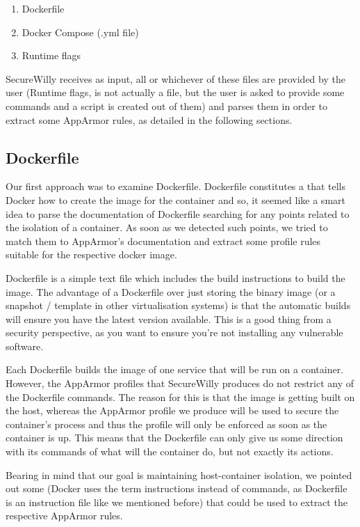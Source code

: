 \begin{enumerate}
\item Dockerfile
\item Docker Compose (.yml file)
\item Runtime flags
\end{enumerate}

SecureWilly receives as input, all or whichever of these files are provided by the user (Runtime flags, is not actually a file, but the user is asked to provide some commands and a script is created out of them) and parses them in order to extract some AppArmor rules, as detailed in the following sections. 

\subsection{Dockerfile}
Our first approach was to examine Dockerfile. Dockerfile constitutes a  that tells Docker how to create the image for the container and so, it seemed like a smart idea to parse the documentation of Dockerfile searching for any points related to the isolation of a container. As soon as we detected such points, we tried to match them to AppArmor's documentation and extract some profile rules suitable for the respective docker image.

Dockerfile is a simple text file which includes the build instructions to build the image. The advantage of a Dockerfile over just storing the binary image (or a snapshot / template in other virtualisation systems) is that the automatic builds will ensure you have the latest version available. This is a good thing from a security perspective, as you want to ensure you're not installing any vulnerable software. \cite{whatsdockerfile}

Each Dockerfile builds the image of one service that will be run on a container. However, the AppArmor profiles that SecureWilly produces do not restrict any of the Dockerfile commands. The reason for this is that the image is getting built on the host, whereas the AppArmor profile we produce will be used to secure the container's process and thus the profile will only be enforced as soon as the container is up. This means that the Dockerfile can only give us some direction with its commands of what will the container do, but not exactly its actions.

Bearing in mind that our goal is maintaining host-container isolation, we pointed out some  (Docker uses the term instructions instead of commands, as Dockerfile is an instruction file like we mentioned before) that could be used to extract the respective AppArmor rules.


